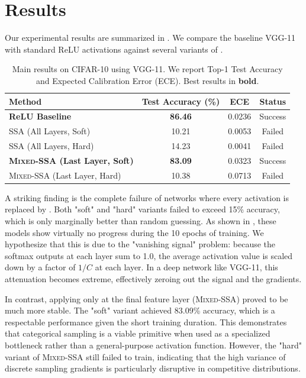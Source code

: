 \section{Results}

Our experimental results are summarized in . We compare the baseline VGG-11 with standard ReLU activations against several variants of \methodname.

\begin{table}[h]
\centering
\caption{Main results on CIFAR-10 using VGG-11. We report Top-1 Test Accuracy and Expected Calibration Error (ECE). Best results in {\bf bold}.}
\label{tab:main_results}
\begin{tabular}{@{}lccc@{}}
\toprule
Method & Test Accuracy (\%) & ECE & Status \\
\midrule
{\bf ReLU Baseline} & {\bf 86.46} & 0.0236 & Success \\
\midrule
\textsc{SSA} (All Layers, Soft) & 10.21 & 0.0053 & Failed \\
\textsc{SSA} (All Layers, Hard) & 14.23 & 0.0041 & Failed \\
\midrule
{\bf \textsc{Mixed-SSA} (Last Layer, Soft)} & {\bf 83.09} & 0.0323 & Success \\
\textsc{Mixed-SSA} (Last Layer, Hard) & 10.38 & 0.0713 & Failed \\
\bottomrule
\end{tabular}
\end{table}

A striking finding is the complete failure of networks where every activation is replaced by \methodname. Both "soft" and "hard" variants failed to exceed 15\% accuracy, which is only marginally better than random guessing. As shown in , these models show virtually no progress during the 10 epochs of training. We hypothesize that this is due to the "vanishing signal" problem: because the softmax outputs at each layer sum to 1.0, the average activation value is scaled down by a factor of $1/C$ at each layer. In a deep network like VGG-11, this attenuation becomes extreme, effectively zeroing out the signal and the gradients.

In contrast, applying \methodname only at the final feature layer (\textsc{Mixed-SSA}) proved to be much more stable. The "soft" variant achieved 83.09\% accuracy, which is a respectable performance given the short training duration. This demonstrates that categorical sampling is a viable primitive when used as a specialized bottleneck rather than a general-purpose activation function. However, the "hard" variant of \textsc{Mixed-SSA} still failed to train, indicating that the high variance of discrete sampling gradients is particularly disruptive in competitive distributions.

